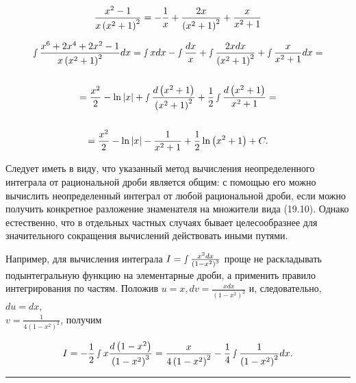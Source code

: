 \documentclass[12pt]{extbook}
\begin{document}


\small
\begin{equation}
    \frac{x^{2}-1}{x\left(x^{2}+1\right)^{2}}=-\frac{1}{x}+\frac{2 x}{\left(x^{2}+1\right)^{2}}+\frac{x}{x^{2}+1} \notag
\end{equation}


\begin{gather}
    \smallint \frac{x^{6}+2 x^{4}+2 x^{2}-1}{x\left(x^{2}+1\right)^{2}} d x=\smallint x d x-\smallint \frac{d x}{x}+\smallint \frac{2 x d x}{\left(x^{2}+1\right)^{2}}+\smallint \frac{x}{x^{2}+1} d x= \notag \\ \notag \\
    =\frac{x^{2}}{2}-\ln |x|+\smallint \frac{d\left(x^{2}+1\right)}{\left(x^{2}+1\right)^{2}}+\frac{1}{2} \smallint \frac{d\left(x^{2}+1\right)}{x^{2}+1}= \notag \\ \notag \\
    =\frac{x^{2}}{2}-\ln |x|-\frac{1}{x^{2}+1}+\frac{1}{2} \ln \left(x^{2}+1\right)+C . \notag
\end{gather}
\setlength{\spaceskip}{10pt}

Следует иметь в виду, что указанный метод вычисления неопределенного интеграла от рациональной дроби является общим: с помощью его можно вычислить неопределенный интеграл от любой рациональной дроби, если можно получить конкретное разложение знаменателя на множители вида (19.10). Однако естественно, что в отдельных частных случаях бывает целесообразнее для значительного сокращения вычислений действовать иными путями.

\setlength{\spaceskip}{2mm}
Например, для вычисления интеграла $I=\smallint \frac{x^{2} d x}{\left(1-x^{2}\right)^{3}}$ проще не раскладывать подынтегральную функцию на элементарные дроби, а применить правило интегрирования по частям. Положив $u=x, d v=\frac{x d x}{\left(1-x^{2}\right)^{3}}$ и, следовательно, $d u=d x$, \\$ v=\frac{1}{4\left(1-x^{2}\right)^{2}} $, получим

\begin{align}
    & \quad I=-\frac{1}{2} \smallint x \frac{d\left(1-x^{2}\right)}{\left(1-x^{2}\right)^{3}}=\frac{x}{4\left(1-x^{2}\right)^{2}}-\frac{1}{4} \smallint \frac{1}{\left(1-x^{2}\right)^{2}} d x . \notag
\end{align}

\begin{center}
\rule{1in}{0.4pt} \\ \textit{\thepage}
\end{center}
\end{document}
